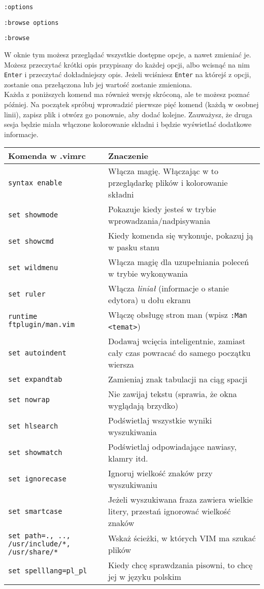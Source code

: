 \documentclass[a4paper,12pt]{article}
\begin{document}
{\tt :options}

{\tt :browse options}

{\tt :browse}

\noindent
W oknie tym możesz przeglądać wszystkie dostępne opcje, a nawet zmieniać je. Możesz przeczytać krótki opis przypisany do każdej opcji, albo wcisnąć na nim {\tt Enter} i przeczytać dokładniejszy opis. Jeżeli wciśniesz {\tt Enter} na którejś z opcji, zostanie ona przełączona lub jej wartość zostanie zmieniona.\\
Każda z poniższych komend ma również wersję skróconą, ale te możesz poznać później. Na początek spróbuj wprowadzić pierwsze pięć komend (każdą w osobnej linii), zapisz plik i otwórz go ponownie, aby dodać kolejne. Zauważysz, że druga sesja będzie miała włączone kolorowanie składni i będzie wyświetlać dodatkowe informacje.

\noindent
\begin{tabular}{ p{} | p{8cm} }
{\bf Komenda w .vimrc} & {\bf Znaczenie} \\ \hline
{\tt syntax enable} & Włącza magię. Włączając w to przeglądarkę plików i kolorowanie składni \\
{\tt set showmode} & Pokazuje kiedy jesteś w trybie wprowadzania/nadpisywania \\
{\tt set showcmd} & Kiedy komenda się wykonuje, pokazuj ją w pasku stanu \\
{\tt set wildmenu} & Włącza magię dla uzupełniania poleceń w trybie wykonywania \\
{\tt set ruler} & Włącza {\it liniał} (informacje o stanie edytora) u dołu ekranu \\
{\tt runtime ftplugin/man.vim} & Włączę obsługę stron man (wpisz {\tt :Man <temat>}) \\
{\tt set autoindent} & Dodawaj wcięcia inteligentnie, zamiast cały czas powracać do samego początku wiersza \\
{\tt set expandtab} & Zamieniaj znak tabulacji na ciąg spacji \\
{\tt set nowrap} & Nie zawijaj tekstu (sprawia, że okna wyglądają brzydko) \\
{\tt set hlsearch} & Podświetlaj wszystkie wyniki wyszukiwania \\
{\tt set showmatch} & Podświetlaj odpowiadające nawiasy, klamry itd. \\
{\tt set ignorecase} & Ignoruj wielkość znaków przy wyszukiwaniu \\
{\tt set smartcase} & Jeżeli wyszukiwana fraza zawiera wielkie litery, przestań ignorować wielkość znaków \\
{\tt set path=., .., /usr/include/*, /usr/share/*} & Wskaż ścieżki, w których VIM ma szukać plików \\
{\tt set spelllang=pl\_pl} & Kiedy chcę sprawdzania pisowni, to chcę jej w języku polskim\\ \hline
\end{tabular}\\
\end{document}
